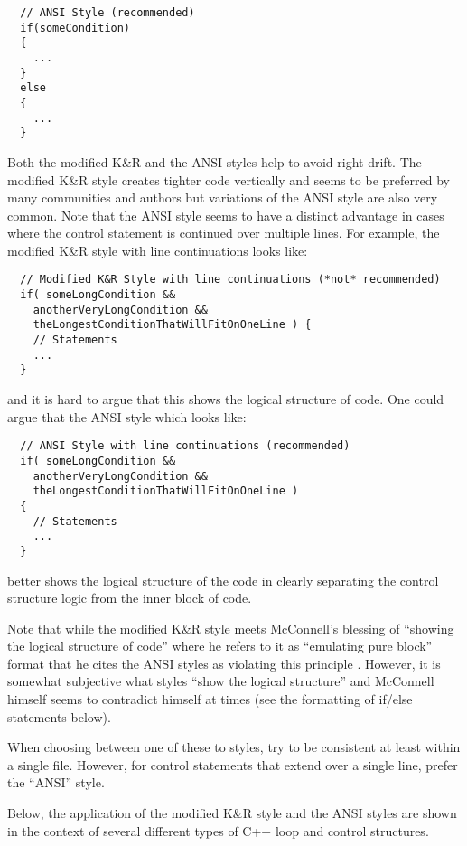\begin{enumerate}
{\small\begin{verbatim}
  // ANSI Style (recommended)
  if(someCondition)
  {
    ...
  }
  else
  {
    ...
  }
\end{verbatim}}

Both the modified K\&R and the ANSI styles help to avoid right drift.  The
modified K\&R style creates tighter code vertically and seems to be preferred
by many communities and authors but variations of the ANSI style are also very
common.  Note that the ANSI style seems to have a distinct advantage in cases
where the control statement is continued over multiple lines.  For example,
the modified K\&R style with line continuations looks like:

{\small\begin{verbatim}
  // Modified K&R Style with line continuations (*not* recommended)
  if( someLongCondition &&
    anotherVeryLongCondition &&
    theLongestConditionThatWillFitOnOneLine ) {
    // Statements
    ...
  }
\end{verbatim}}

{}\noindent{}and it is hard to argue that this shows the logical structure of
code.  One could argue that the ANSI style which looks like:

{\small\begin{verbatim}
  // ANSI Style with line continuations (recommended)
  if( someLongCondition &&
    anotherVeryLongCondition &&
    theLongestConditionThatWillFitOnOneLine )
  {
    // Statements
    ...
  }
\end{verbatim}}

better shows the logical structure of the code in clearly separating the
control structure logic from the inner block of code.

Note that while the modified K\&R style meets McConnell's blessing of
``showing the logical structure of code'' where he refers to it as ``emulating
pure block'' format that he cites the ANSI styles as violating this principle
{}\cite[Section 31.1]{CodeComplete2nd04}.  However, it is somewhat subjective
what styles ``show the logical structure'' and McConnell himself seems to
contradict himself at times (see the formatting of if/else statements below).

When choosing between one of these to styles, try to be consistent at least
within a single file.  However, for control statements that extend over a
single line, prefer the ``ANSI'' style.

Below, the application of the modified K\&R style and the ANSI styles are
shown in the context of several different types of C++ loop and control
structures.


\end{enumerate}
